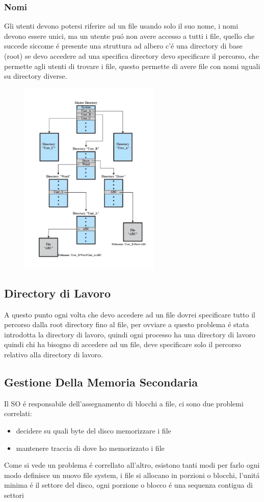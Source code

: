 \subsubsection{Nomi}
Gli utenti devono potersi riferire ad un file usando solo il suo nome, i nomi devono essere unici, ma un utente puó non avere
accesso a tutti i file, quello che succede siccome é presente una struttura ad albero c'é una directory di base (root) se
devo accedere ad una specifica directory devo specificare il percorso, che permette agli utenti di trovare i file, questo
permette di avere file con nomi uguali su directory diverse.
\begin{figure}[H]
    \centering
    \includegraphics[width=0.6\textwidth]{immagini/EsempioAlberoNomiFile}
\end{figure}
\subsection{Directory di Lavoro}
A questo punto ogni volta che devo accedere ad un file dovrei specificare tutto il percorso dalla root directory fino al file,
per ovviare a questo problema é stata introdotta la directory di lavoro, quindi ogni processo ha una directory di lavoro
quindi chi ha bisogno di accedere ad un file, deve specificare solo il percorso relativo alla directory di lavoro.
\subsection{Gestione Della Memoria Secondaria}
Il SO é responsabile dell'assegnamento di blocchi a file, ci sono due problemi correlati:
\begin{itemize}
    \item decidere su quali byte del disco memorizzare i file
    \item mantenere traccia di dove ho memorizzato i file
\end{itemize}
Come si vede un problema é correllato all'altro, esistono tanti modi per farlo ogni modo definisce un nuovo file system,
i file si allocano in porzioni o blocchi, l'unitá minima é il settore del disco, ogni porzione o blocco é una sequenza contigua di
settori
